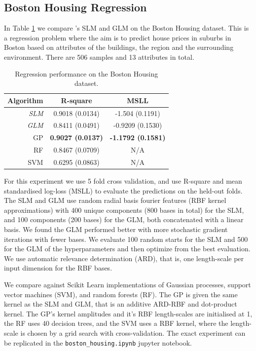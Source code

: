 \documentclass[11pt, oneside]{article}
\begin{document}
\subsection{Boston Housing Regression}

In Table \ref{tab:bostonhousing} we compare \revrand{}'s SLM and GLM on the
Boston Housing dataset. This is a regression problem where the aim is to
predict house prices in suburbs in Boston based on attributes of the buildings,
the region and the surrounding environment. There are 506 samples and 13
attributes in total.

\begin{table}[tb]

    \centering
    \caption{Regression performance on the Boston Housing dataset.}
    \label{tab:bostonhousing}
    \begin{tabular}{r|c c}
        \textbf{Algorithm} & \textbf{R-square} & \textbf{MSLL} \\
        \hline
        \emph{SLM} & 0.9018 (0.0134) & -1.504 (0.1191) \\
        \emph{GLM} & 0.8411 (0.0491) & -0.9209 (0.1530) \\
        GP & \textbf{0.9027 (0.0137)} & \textbf{-1.1792 (0.1581)} \\
        RF & 0.8467 (0.0709) & N/A \\ 
        SVM & 0.6295 (0.0863) & N/A \\
        \hline
    \end{tabular}

\end{table}

For this experiment we use 5 fold cross validation, and use R-square and mean
standardised log-loss (MSLL) to evaluate the predictions on the held-out folds.
The SLM and GLM use random radial basis fourier features (RBF kernel
approximations) with 400 unique components (800 bases in total) for the SLM,
and 100 components (200 bases) for the GLM, both concatenated with a linear
basis. We found the GLM performed better with more stochastic gradient
iterations with fewer bases. We evaluate 100 random starts for the SLM and 500
for the GLM of the hyperparameters and then optimize from the best evaluation.
We use automatic relevance determination (ARD), that is, one length-scale per input
dimension for the RBF bases.

We compare against Scikit Learn \citep{scikit-learn} implementations of
Gaussian processes, support vector machines (SVM), and random forests (RF).
The GP is given the same kernel as the SLM and GLM, that is an additive ARD-RBF
and dot-product kernel. The GP's kernel amplitudes and it's RBF length-scales
are initialised at 1, the RF uses 40 decision trees, and the SVM uses a RBF
kernel, where the length-scale is chosen by a grid search with
cross-validation. The exact experiment can be replicated in the
\texttt{boston\_housing.ipynb} jupyter notebook.
\end{document}
